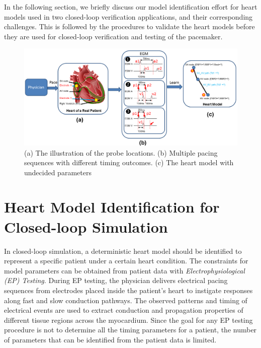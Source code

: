 In the following section, we briefly discuss our model identification effort for heart models used in two closed-loop verification applications, and their corresponding challenges. This is followed by the procedures to validate the heart models before they are used for closed-loop verification and testing of the pacemaker.
\begin{figure}[!b]
\centering
		\includegraphics[width=0.9  \textwidth]{figs/modelID.png}
		
\caption{\small (a) The illustration of the probe locations. (b) Multiple pacing sequences with different timing outcomes. (c) The heart model with undecided parameters}
\label{fig:modelID}
\end{figure} 

\section{Heart Model Identification for Closed-loop Simulation}
In closed-loop simulation, a deterministic heart model should be identified to represent a specific patient under a certain heart condition. The constraints for model parameters can be obtained from patient data with \emph{Electrophysiological (EP) Testing}. During EP testing, the physician delivers electrical pacing sequences from electrodes placed inside the patient's heart to instigate responses along fast and slow conduction pathways. The observed patterns and timing of electrical events are used to extract conduction and propagation properties of different tissue regions across the myocardium. Since the goal for any EP testing procedure is not to determine all the timing parameters for a patient, the number of parameters that can be identified from the patient data is limited.    

